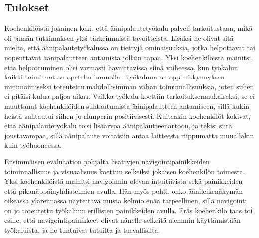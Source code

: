 \documentclass[utf8]{gradu3}
\begin{document}
\subsection{Tulokset}

Koehenkilöistä jokainen koki, että äänipalautetyökalu palveli tarkoitustaan, mikä oli tämän tutkimuksen yksi tärkeimmistä tavoitteista. Lisäksi he olivat sitä mieltä, että äänipalautetyökalussa on tiettyjä ominaisuuksia, jotka helpottavat tai nopeuttavat äänipalautteen antamista jollain tapaa. Yksi koehenkilöistä mainitsi, että helpottuminen olisi varmasti havaittavissa siinä vaiheessa, kun työkalun kaikki toiminnot on opeteltu kunnolla. Työkaluun on oppimiskynnyksen minimoimiseksi toteutettu mahdollisimman vähän toiminnallisuuksia, joten siihen ei pitäisi kulua paljoa aikaa. Vaikka työkalu koettiin tarkoituksenmukaiseksi, se ei muuttanut koehenkilöiden suhtautumista äänipalautteen antamiseen, sillä kukin heistä suhtautui siihen jo alunperin positiivisesti. Kuitenkin koehenkilöt kokivat, että äänipalautetyökalu toisi lisäarvoa äänipalautteenantoon, ja tekisi siitä joustavampaa, sillä äänipalaute voitaisiin antaa laitteesta riippumatta muuallakin kuin työhuoneessa.

Ensimmäisen evaluaation pohjalta lisättyjen navigointipainikkeiden toiminnallisuus ja visuaalisuus koettiin selkeiksi jokaisen koehenkilön toimesta. Yksi koehenkilöistä mainitsi navigoinnin olevan intuitiivista sekä painikkeiden että pikanäppäinyhdistelmien avulla. Hän myös pohti, onko äänileikenäkymän oikeassa yläreunassa näytettävä musta kolmio enää tarpeellinen, sillä navigointi on jo toteutettu työkaluun erillisten painikkeiden avulla. Eräs koehenkilö taas toi esille, että navigointipainikkeet olivat nänelle selkeitä aiemmin käyttämistään työkaluista, ja ne tuntuivat tutuilta ja turvallisilta.
\end{document}
